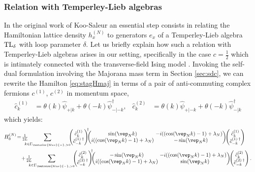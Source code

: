 \documentclass[a4paper, 11pt]{article}
\newcommand{\textb}{\textcolor{blue}}
\DeclareMathOperator{\1}{\mathds{1}}
\DeclareMathOperator{\TL}{\textup{TL}}
\begin{document}
\subsubsection{Relation with Temperley-Lieb algebras}
\label{sec:tl}
In the original work of Koo-Saleur \cite{KooRepresentationsOfThe} an essential step consists in relating the Hamiltonian lattice density $h^{(N)}_{x}$ to generators $e_{x}$ of a Temperley-Lieb algebra $\TL_{\delta}$ with loop parameter $\delta$. Let us briefly explain how such a relation with Temperley-Lieb algebras \cite{TemperleyRelationsBetweenThe, GrimmTheSpin12} arises in our setting, specifically in the case $c=\tfrac{1}{2}$ which is intimately connected with the transverse-field Ising model \cite{SchultzTwoDimensionalIsing}.
Invoking the self-dual formulation involving the Majorana mass term in Section \ref{sec:sdc}, we can rewrite the Hamilton \eqref{eq:stagHmaj} in terms of a pair of anti-commuting complex fermions $c^{(1)}$, $c^{(2)}$ in momentum space,
\begin{align}
\hat{c}^{(1)}_{k} & = \theta(k)\hat{\psi}_{+|k}+\theta(-k)\hat{\psi}^{\dag}_{-|-k}, & \hat{c}^{(2)}_{k} & = \theta(k)\hat{\psi}_{+|-k}+\theta(-k)\hat{\psi}^{\dag}_{-|k}
\end{align}
which yields:
\begin{align}
\label{eq:isingham1}
H^{(N)}_{0} & \!=\!\tfrac{1}{2L}\!\!\!\!\!\sum_{k\in\Gamma_{\textb{-},>0}} \!\!\!\begin{pmatrix} \hat{c}^{(1)}_{k} \\ \hat{c}^{(1)\!\ \dag}_{-k} \end{pmatrix}^{\!\!\dagger}\!\!\!\begin{pmatrix} \sin(\vep_{N}k) & \!\!\!\!-i((\cos(\vep_{N}k)-1) + \lambda_{N}) \\ i((\cos(\vep_{N}k)-1) + \lambda_{N}) & -\sin(\vep_{N}k) \end{pmatrix}\!\! \begin{pmatrix} \hat{c}^{(1)}_{k} \\ \hat{c}^{(1)\!\ \dag}_{-k} \end{pmatrix} \\ \nonumber
& \hspace{0.25cm}+\!\tfrac{1}{2L}\!\!\!\!\!\sum_{k\in\Gamma_{\textb{-},>0}} \!\!\!\begin{pmatrix} \hat{c}^{(2)}_{k} \\ \hat{c}^{(2)\!\ \dag}_{-k} \end{pmatrix}^{\!\!\dagger}\!\!\!\begin{pmatrix} -\sin(\vep_{N}k) & \!\!\!\!-i((\cos(\vep_{N}k)-1) + \lambda_{N}) \\ i((\cos(\vep_{N}k)-1) + \lambda_{N}) & \sin(\vep_{N}k) \end{pmatrix}\!\! \begin{pmatrix} \hat{c}^{(2)}_{k} \\ \hat{c}^{(2)\!\ \dag}_{-k} \end{pmatrix} .
\end{align}
\end{document}
